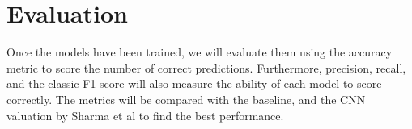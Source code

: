 \documentclass[12pt, onecolumn, letterpaper]{IEEEtran}
\begin{document}
\section{Evaluation}
Once the models have been trained, we will evaluate them using the accuracy metric to score the number of correct predictions.
Furthermore, precision, recall, and the classic F1 score will also measure the ability of each model to score correctly.
The metrics will be compared with the baseline, and the CNN valuation by Sharma et al to find the best performance.
\end{document}
